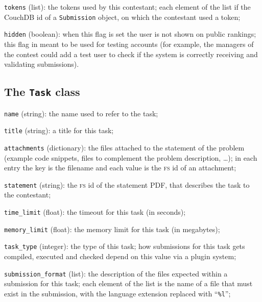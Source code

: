 \documentclass[a4paper,8pt]{amsart}
\newcommand{\FS}{\textsc{fs}}
\newenvironment{squishlist}{%
  \begin{list}{\textbullet}%
    { \setlength{\itemsep}{0pt}%
      \setlength{\parsep}{3pt}%
      \setlength{\topsep}{3pt}%
      \setlength{\partopsep}{0pt}%
      \setlength{\leftmargin}{1.5em}%
      \setlength{\labelwidth}{1em}%
      \setlength{\labelsep}{0.5em} }%
}{\end{list}}
\newcommand{\id}[1]{\texttt{#1}}
\begin{document}
\begin{multicols}{2}
\begin{squishlist}
  \item \id{tokens} (list): the tokens used by this contestant; each
    element of the list if the CouchDB id of a \id{Submission} object,
    on which the contestant used a token;

  \item \id{hidden} (boolean): when this flag is set the user is not
    shown on public rankings; this flag in meant to be used for
    testing accounts (for example, the managers of the contest could
    add a test user to check if the system is correctly receiving and
    validating submissions).

  \end{squishlist}

  \subsection{The \id{Task} class}

  \begin{squishlist}

  \item \id{name} (string): the name used to refer to the task;

  \item \id{title} (string): a title for this task;

  \item \id{attachments} (dictionary): the files attached to the
    statement of the problem (example code snippets, files to
    complement the problem description, \dots); in each entry the key
    is the filename and each value is the \FS{} id of an attachment;

  \item \id{statement} (string): the \FS{} id of the statement PDF,
    that describes the task to the contestant;

  \item \id{time\_limit} (float): the timeout for this task (in
    seconds);

  \item \id{memory\_limit} (float): the memory limit for this task (in
    megabytes);

  \item \id{task\_type} (integer): the type of this task; how
    submissions for this task gets compiled, executed and checked
    depend on this value via a plugin system;

  \item \id{submission\_format} (list): the description of the files
    expected within a submission for this task; each element of the
    list is the name of a file that must exist in the submission, with
    the language extension replaced with ``\texttt{\%l}'';


\end{squishlist}
\end{multicols}
\end{document}
